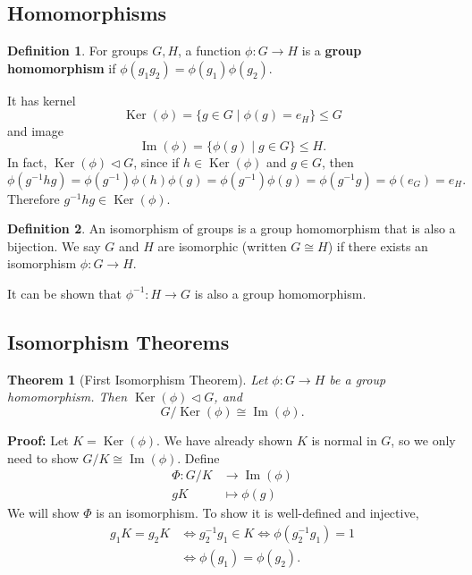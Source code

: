\documentclass[12pt]{article}
\DeclareMathOperator{\Ker}{Ker}
\DeclareMathOperator{\Img}{Im}
\newtheorem{theorem}{Theorem}[section]
\theoremstyle{definition}
\newtheorem{definition}{Definition}[section]
\theoremstyle{remark}
\begin{document}
\subsection{Homomorphisms}%
\label{sub:homomorphisms}

\begin{definition}
	For groups $G, H$, a function $\phi : G \to H$ is a \textbf{group homomorphism} if $\phi(g_1g_2) = \phi(g_1)\phi(g_2)$.
\end{definition}
It has kernel
\[
	\Ker(\phi) = \{g \in G \mid \phi(g) = e_H\} \leq G
\]
and image
\[
	\Img(\phi) = \{\phi(g) \mid g \in G\} \leq H
.\]
In fact, $\Ker(\phi) \lhd G$, since if $h \in \Ker(\phi)$ and $g \in G$, then
\[
	\phi(g^{-1}hg) = \phi(g^{-1})\phi(h)\phi(g) = \phi(g^{-1})\phi(g) = \phi(g^{-1}g) = \phi(e_G) = e_H
.\]
Therefore $g^{-1}hg \in \Ker(\phi)$.

\begin{definition}
	An isomorphism of groups is a group homomorphism that is also a bijection. We say $G$ and $H$ are isomorphic (written $G \cong H$) if there exists an isomorphism $\phi : G \to H$.
\end{definition}
It can be shown that $\phi^{-1} : H \to G$ is also a group homomorphism.

\subsection{Isomorphism Theorems}%
\label{sub:isomorphism_theorems_groups}

\begin{theorem}[First Isomorphism Theorem]
	Let $\phi : G \to H$ be a group homomorphism. Then $\Ker(\phi) \lhd G$, and
	\[
		G / \Ker(\phi) \cong \Img (\phi)
	.\]
\end{theorem}

\begin{adjustbox}{minipage = \columnwidth - 25.5pt, margin=1em, frame=1pt, margin=0em}
\textbf{Proof:} Let $K = \Ker(\phi)$. We have already shown $K$ is normal in $G$, so we only need to show $G/K \cong \Img(\phi)$. Define
\begin{align*}
	\Phi : G/K &\to \Img(\phi) \\
	gK &\mapsto \phi(g)
\end{align*}
We will show $\Phi$ is an isomorphism. To show it is well-defined and injective,
\begin{align*}
	g_1K = g_2K &\iff g_2^{-1}g_1 \in K \iff \phi(g_2^{-1}g_1) = 1 \\
		    &\iff \phi(g_1) = \phi(g_2).
\end{align*}
\end{adjustbox}
\end{document}
